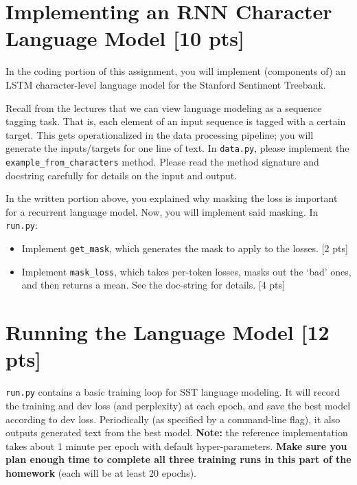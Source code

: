 \documentclass[11pt]{article}
\begin{document}
\section{Implementing an RNN Character Language Model [10 pts]}

In the coding portion of this assignment, you will implement (components of) an LSTM character-level language model for the Stanford Sentiment Treebank.

\vspace{2em}
 Recall from the lectures that we can view language modeling as a sequence tagging task.  That is, each element of an input sequence is tagged with a certain target.  This gets operationalized in the data processing pipeline; you will generate the inputs/targets for one line of text. In \texttt{data.py}, please implement the \texttt{example\_from\_characters} method.  Please read the method signature and docstring carefully for details on the input and output.

\vspace{2em}
 In the written portion above, you explained why masking the loss is important for a recurrent language model.  Now, you will implement said masking.  In \texttt{run.py}:
\begin{itemize}
  \item Implement \texttt{get\_mask}, which generates the mask to apply to the losses. [2 pts]
  \item Implement \texttt{mask\_loss}, which takes per-token losses, masks out the `bad' ones, and then returns a mean.  See the doc-string for details. [4 pts]
\end{itemize}

\section{Running the Language Model [12 pts]}

\texttt{run.py} contains a basic training loop for SST language modeling. It will record the training and dev loss (and perplexity) at each epoch, and save the best model according to dev loss.  Periodically (as specified by a command-line flag), it also outputs generated text from the best model. \textbf{Note:} the reference implementation takes about 1 minute per epoch with default hyper-parameters. \textbf{Make sure you plan enough time to complete all three training runs in this part of the homework} (each will be at least 20 epochs).
\end{document}
